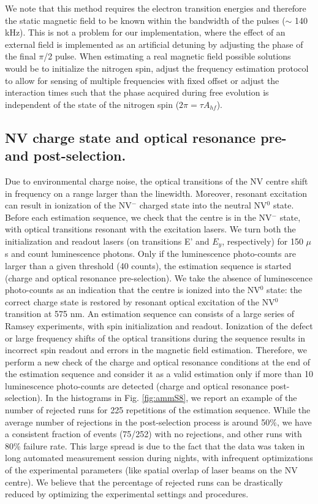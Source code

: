 We note that this method requires the electron transition energies and therefore the static magnetic field to be known within the bandwidth of the pulses ($\sim$ 140 kHz). This is not a problem for our implementation, where the effect of an external field is implemented as an artificial detuning by adjusting the phase of the final $\pi$/2 pulse. When estimating a real magnetic field possible solutions would be to initialize the nitrogen spin, adjust the frequency estimation protocol to allow for sensing of multiple frequencies with fixed offset or adjust the interaction times such that the phase acquired during free evolution is independent of the state of the nitrogen spin ($2 \pi = \tau A_{hf}$).

\subsection{NV charge state and optical resonance pre- and post-selection.}
\label{sec:ammCR}
Due to environmental charge noise, the optical transitions of the NV centre shift in frequency on a range larger than the linewidth. Moreover, resonant excitation can result in ionization of the NV$^-$ charged state into the neutral NV$^0$ state.
Before each estimation sequence, we check that the centre is in the NV$^-$ state, with optical transitions resonant with the excitation lasers. We turn both the initialization and readout lasers (on transitions E’ and $E_y$, respectively) for 150 $\mu$s and count luminescence photons. Only if the luminescence photo-counts are larger than a given threshold (40 counts), the estimation sequence is started (charge and optical resonance pre-selection). We take the absence of luminescence photo-counts as an indication that the centre is ionized into the NV$^0$ state: the correct charge state is restored by resonant optical excitation of the NV$^0$ transition at 575 nm.
An estimation sequence can consists of a large series of Ramsey experiments, with spin initialization and readout. Ionization of the defect or large frequency shifts of the optical transitions during the sequence results in incorrect spin readout and errors in the magnetic field estimation. Therefore, we perform a new check of the charge and optical resonance conditions at the end of the estimation sequence and consider it as a valid estimation only if more than 10 luminescence photo-counts are detected (charge and optical resonance post-selection).
In the histograms in Fig. \ref{fig:ammS8}, we report an example of the number of rejected runs for 225 repetitions of the estimation sequence. While the average number of rejections in the post-selection process is around 50\%, we have a consistent fraction of events (75/252) with no rejections, and other runs with 80\% failure rate. This large spread is due to the fact that the data was taken in long automated measurement session during nights, with infrequent optimizations of the experimental parameters (like spatial overlap of laser beams on the NV centre). We believe that the percentage of rejected runs can be drastically reduced by optimizing the experimental settings and procedures.
